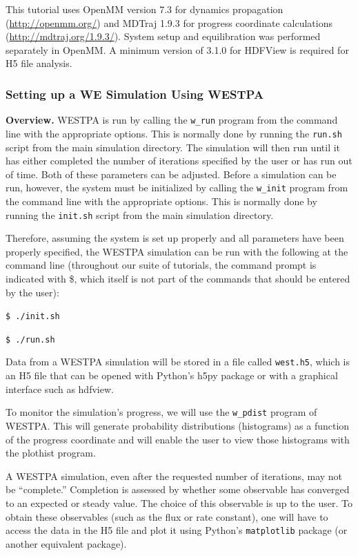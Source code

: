 \documentclass[9pt,tutorial,pubversion]{livecoms}
\begin{document}
This tutorial uses OpenMM version 7.3 for dynamics propagation (\url{http://openmm.org/}) and MDTraj 1.9.3 for progress coordinate calculations (\url{http://mdtraj.org/1.9.3/}). System setup and equilibration was performed separately in OpenMM. A minimum version of 3.1.0 for HDFView is required for H5 file analysis.

\subsubsection{Setting up a WE Simulation Using WESTPA}

\textbf{Overview.} WESTPA is run by calling the \verb|w_run| program from the command line with the appropriate options. 
This is normally done by running the \verb|run.sh| script from the main simulation directory. 
The simulation will then run until it has either completed the number of iterations specified by the user or has run out of time. 
Both of these parameters can be adjusted. 
Before a simulation can be run, however, the system must be initialized by calling the \verb|w_init| program from the command line with the appropriate options. 
This is normally done by running the \verb|init.sh| script from the main simulation directory.

Therefore, assuming the system is set up properly and all parameters have been properly specified, the WESTPA simulation can be run with the following at the command line (throughout our suite of tutorials, the command prompt is indicated with \$, which itself is not part of the commands that should be entered by the user):
 
\verb|$ ./init.sh|

\verb|$ ./run.sh|
 
Data from a WESTPA simulation will be stored in a file called \verb|west.h5|, which is an H5 file that can be opened with Python’s h5py package or with a graphical interface such as hdfview.

To monitor the simulation’s progress, we will use  the \verb|w_pdist| program of WESTPA. 
This will generate probability distributions (histograms) as a function of the progress coordinate and will enable the user to view those histograms with the plothist program. 

A WESTPA simulation, even after the requested number of iterations, may not be “complete.”  
Completion is assessed by whether some observable has converged to an expected or steady value. 
The choice of this observable is up to the user. 
To obtain these observables (such as the flux or rate constant), one will have to access the data in the H5 file and plot it using Python’s \verb|matplotlib| package (or another equivalent package).
\end{document}
